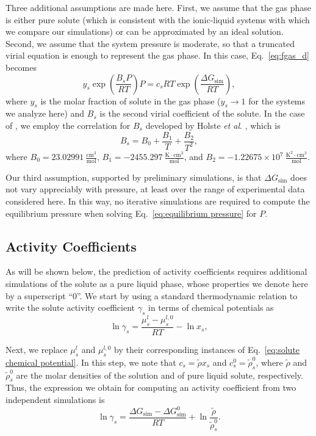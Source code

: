 \documentclass[3p,twocolumn]{elsarticle}
\begin{document}
Three additional assumptions are made here. First, we assume that the gas phase is either pure solute (which is consistent with the ionic-liquid systems with which we compare our simulations) or can be approximated by an ideal solution. Second, we assume that the system pressure is moderate, so that a truncated virial equation is enough to represent the gas phase. In this case, Eq.~\eqref{eq:fgas_d} becomes
\begin{equation}
\label{eq:equilibrium pressure}
y_s \exp\left( \frac{B_s P}{R T} \right) P = c_s R T \exp \left( \frac{\Delta G_\text{sim}}{R T} \right),
\end{equation}
where $y_s$ is the molar fraction of solute in the gas phase ($y_s \rightarrow 1$ for the systems we analyze here) and $B_s$ is the second virial coefficient of the solute.
In the case of , we employ the correlation for $B_s$ developed by Holste \textit{et al}. \cite{Holste_1987}, which is
\begin{equation}
B_s = B_0 + \frac{B_1}{T} + \frac{B_2}{T^2},
\end{equation}
where $B_0 = 23.02991~\mathrm{\frac{cm^3}{mol}}$, $B_1 = -2455.297~\mathrm{\frac{K \cdot cm^3}{mol}}$, and $B_2 = -1.22675 \times 10^7~\mathrm{\frac{K^2 \cdot cm^3}{mol}}$.

Our third assumption, supported by preliminary simulations, is that $\Delta G_\text{sim}$ does not vary appreciably with pressure, at least over the range of experimental data considered here.
In this way, no iterative simulations are required to compute the equilibrium pressure when solving Eq.~\eqref{eq:equilibrium pressure} for $P$.

\subsection*{Activity Coefficients}

As will be shown below, the prediction of activity coefficients requires additional simulations of the solute as a pure liquid phase, whose properties we denote here by a superscript ``$0$''.
We start by using a standard thermodynamic relation \cite{Tester} to write the solute activity coefficient $\gamma_s$ in terms of chemical potentials as
\begin{equation}
\label{eq:gamma}
\ln \gamma_s = \frac{\mu_s^l - \mu_s^{l,0}}{R T} - \ln x_s,
\end{equation}

Next, we replace $\mu_s^l$ and $\mu_s^{l,0}$ by their corresponding instances of Eq.~\eqref{eq:solute chemical potential}. In this step, we note that $c_s = \tilde{\rho} x_s$ and $c_s^0 = \tilde{\rho}_s^0$, where $\tilde{\rho}$ and $\tilde{\rho}_s^0$ are the molar densities of the solution and of pure liquid solute, respectively. Thus, the expression we obtain for computing an activity coefficient from two independent simulations is
\begin{equation}
\ln \gamma_s = \frac{\Delta G_\text{sim} - \Delta G_\text{sim}^{0}}{R T} + \ln \frac{\tilde{\rho}}{\tilde{\rho}_s^0}.
\end{equation}
\end{document}
